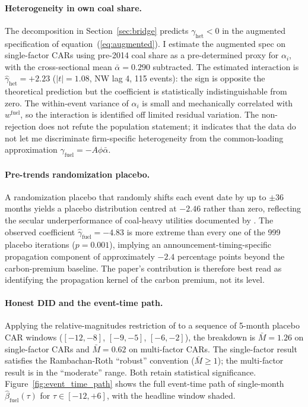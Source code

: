\documentclass[12pt,a4paper]{article}
\begin{document}
\paragraph{Heterogeneity in own coal share.}
The decomposition in Section~\ref{sec:bridge} predicts $\gamma_{\mathrm{het}} < 0$ in the augmented specification of equation~(\ref{eq:augmented}). I estimate the augmented spec on single-factor CARs using pre-2014 coal share as a pre-determined proxy for $\alpha_i$, with the cross-sectional mean $\bar\alpha = 0.290$ subtracted. The estimated interaction is $\hat\gamma_{\mathrm{het}} = +2.23$ ($|t| = 1.08$, NW lag 4, 115 events): the sign is opposite the theoretical prediction but the coefficient is statistically indistinguishable from zero. The within-event variance of $\alpha_i$ is small and mechanically correlated with $w^{\mathrm{fuel}}$, so the interaction is identified off limited residual variation. The non-rejection does not refute the population statement; it indicates that the data do not let me discriminate firm-specific heterogeneity from the common-loading approximation $\gamma_{\mathrm{fuel}} = -A\phi\bar\alpha$.

\paragraph{Pre-trends randomization placebo.}
A randomization placebo that randomly shifts each event date by up to $\pm 36$ months yields a placebo distribution centred at $-2.46$ rather than zero, reflecting the secular underperformance of coal-heavy utilities documented by \citet{Bolton2021,BoltonKacperczyk2023,PastorStambaughTaylor2022}. The observed coefficient $\hat\gamma_{\text{fuel}} = -4.83$ is more extreme than every one of the 999 placebo iterations ($p = 0.001$), implying an announcement-timing-specific propagation component of approximately $-2.4$ percentage points beyond the carbon-premium baseline. The paper's contribution is therefore best read as identifying the propagation kernel of the carbon premium, not its level.

\paragraph{Honest DID and the event-time path.}
Applying the relative-magnitudes restriction of \citet{RambachanRoth2023} to a sequence of 5-month placebo CAR windows ($[-12, -8]$, $[-9, -5]$, $[-6, -2]$), the breakdown is $\bar{M} = 1.26$ on single-factor CARs and $\bar{M} = 0.62$ on multi-factor CARs. The single-factor result satisfies the Rambachan-Roth ``robust'' convention ($\bar{M} \geq 1$); the multi-factor result is in the ``moderate'' range. Both retain statistical significance. Figure~\ref{fig:event_time_path} shows the full event-time path of single-month $\hat{\beta}_{\mathrm{fuel}}(\tau)$ for $\tau \in [-12, +6]$, with the headline window shaded.
\end{document}
